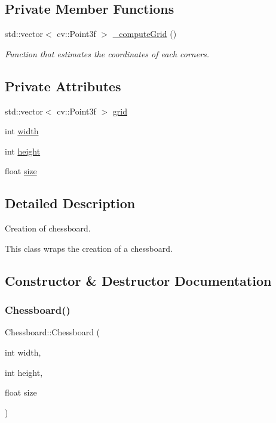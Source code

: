 \subsection*{Private Member Functions}
\begin{DoxyCompactItemize}
\item 
std\+::vector$<$ cv\+::\+Point3f $>$ \hyperlink{class_chessboard_a1c02a45bc0f1bf6430d648d8f63e83e4}{\+\_\+compute\+Grid} ()
\begin{DoxyCompactList}\small\item\em Function that estimates the coordinates of each corners. \end{DoxyCompactList}\end{DoxyCompactItemize}
\subsection*{Private Attributes}
\begin{DoxyCompactItemize}
\item 
std\+::vector$<$ cv\+::\+Point3f $>$ \hyperlink{class_chessboard_aa503005107b822a202c296598a81096b}{grid}
\item 
int \hyperlink{class_chessboard_a508e83c453e3aef8af69bdb934262d83}{width}
\item 
int \hyperlink{class_chessboard_ad7baa62b4f5f47627bae49a53475a56c}{height}
\item 
float \hyperlink{class_chessboard_a898569d2e3c1e297f9915fa437c41082}{size}
\end{DoxyCompactItemize}


\subsection{Detailed Description}
Creation of chessboard. 

This class wraps the creation of a chessboard. 

\subsection{Constructor \& Destructor Documentation}
\mbox{\label{class_chessboard_aa80499df26acccc4fd9d6449c1d847f0}} 
\subsubsection{\texorpdfstring{Chessboard()}{Chessboard()}}
{\footnotesize\ttfamily Chessboard\+::\+Chessboard (\begin{DoxyParamCaption}\item[{int}]{width,  }\item[{int}]{height,  }\item[{float}]{size }\end{DoxyParamCaption})}



